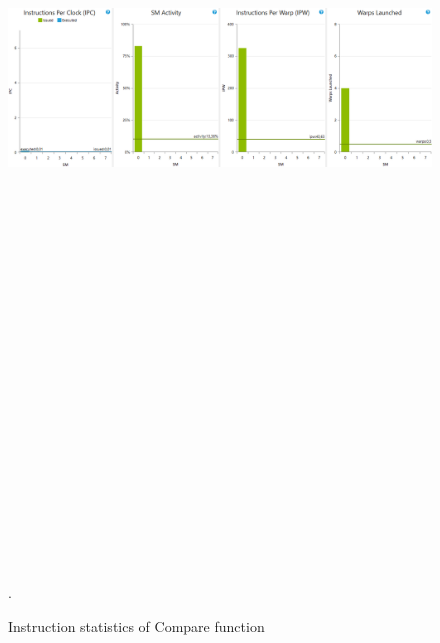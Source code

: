 \documentclass[oneside,openright,12pt,final,en]{mgr}
\begin{document}
\begin{figure}[H]
	\centering
	\includegraphics[width=\textwidth, height=26cm,keepaspectratio]{compare_instructions}.
	\caption{Instruction statistics of Compare function}
	\label{fig:compare_instructions}
\end{figure}
\end{document}
